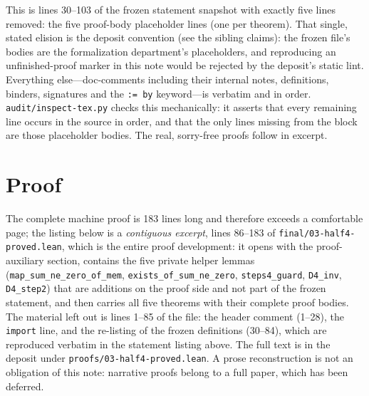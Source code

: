 \documentclass[11pt]{article}
\begin{document}
\noindent This is lines 30--103 of the frozen statement snapshot with exactly five lines
removed: the five proof-body placeholder lines (one per theorem). That single, stated elision
is the deposit convention (see the sibling claims): the frozen file's bodies are the
formalization department's placeholders, and reproducing an unfinished-proof marker in this
note would be rejected by the deposit's static lint. Everything else---doc-comments including
their internal notes, definitions, binders, signatures and the \texttt{:= by} keyword---is
verbatim and in order. \texttt{audit/inspect-tex.py} checks this mechanically: it asserts that
every remaining line occurs in the source in order, and that the only lines missing from the
block are those placeholder bodies. The real, sorry-free proofs follow in excerpt.

\section{Proof}
The complete machine proof is 183 lines long and therefore exceeds a comfortable page; the
listing below is a \emph{contiguous excerpt}, lines 86--183 of
\texttt{final/03-half4-proved.lean}, which is the entire proof development: it opens with the
proof-auxiliary section, contains the five private helper lemmas
(\texttt{map\_sum\_ne\_zero\_of\_mem}, \texttt{exists\_of\_sum\_ne\_zero},
\texttt{steps4\_guard}, \texttt{D4\_inv}, \texttt{D4\_step2}) that are additions on the proof
side and not part of the frozen statement, and then carries all five theorems with their
complete proof bodies. The material left out is lines 1--85 of the file: the header comment
(1--28), the \texttt{import} line, and the re-listing of the frozen definitions (30--84),
which are reproduced verbatim in the statement listing above. The full text is in the deposit
under \texttt{proofs/03-half4-proved.lean}. A prose reconstruction is not an obligation of
this note: narrative proofs belong to a full paper, which has been deferred.
\end{document}
